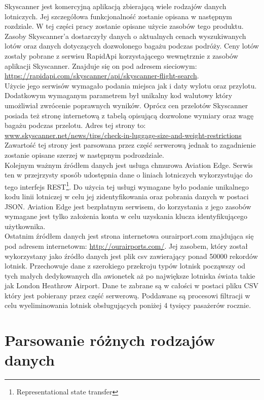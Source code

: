 \documentclass[12pt, twoside]{report}
\begin{document}
Skyscanner jest komercyjną aplikacją zbierającą wiele rodzajów danych lotniczych. Jej szczegółowa funkcjonalność zostanie opisana w następnym rozdziale. W tej części pracy zostanie opisane użycie zasobów tego produktu. Zasoby Skyscanner'a dostarczyły danych o aktualnych cenach wyszukiwanych lotów oraz danych dotyczących dozwolonego bagażu podczas podróży. Ceny lotów zostały pobrane z serwisu RapidApi korzystającego wewnętrznie z zasobów aplikacji Skyscanner. Znajduje się on pod adresem sieciowym: \url{https://rapidapi.com/skyscanner/api/skyscanner-flight-search}.\\
Użycie jego serwisów wymagało podania miejsca jak i daty wylotu oraz przylotu. Dodatkowym wymaganym parametrem był unikalny kod walutowy który umożliwiał zwrócenie poprawnych wyników. Oprócz cen przelotów Skyscanner posiada też stronę internetową z tabelą opisującą dozwolone wymiary oraz wagę bagażu podczas przelotu. Adres tej strony to: \url{www.skyscanner.net/news/tips/check-in-luggage-size-and-weight-restrictions}\\
Zawartość tej strony jest parsowana przez część serwerową jednak to zagadnienie zostanie opisane szerzej w następnym podrozdziale.\\ \indent
Kolejnym ważnym źródłem danych jest usługa chmurowa Aviation Edge. Serwis ten w przejrzysty sposób udostępnia dane o liniach lotniczych wykorzystując do tego interfejs REST\footnote{Representational state transfer}. Do użycia tej usługi wymagane było podanie unikalnego kodu linii lotniczej w celu jej zidentyfikowania oraz pobrania danych w postaci JSON. Aviation Edge jest bezpłatnym serwisem, do korzystania z jego zasobów wymagane jest tylko założenia konta w celu uzyskania klucza identyfikującego użytkownika. \\ \indent
Ostatnim źródłem danych jest strona internetowa ourairport.com znajdująca się pod adresem internetowm: \url{http://ourairports.com/}. Jej zasobem, który został wykorzystany jako źródło danych jest plik csv zawierający ponad 50000 rekordów lotnisk. Przechowuje dane z szerokiego przekroju typów lotnisk począwszy od tych małych dedykowanych dla awionetek aż po największe lotniska świata takie jak London Heathrow Airport. Dane te zabrane są w całości w postaci pliku CSV który jest pobierany przez część serwerową. Poddawane są procesowi filtracji w celu wyeliminowania lotnisk obsługujących poniżej 4 tysięcy pasażerów rocznie.
\newpage
\section{Parsowanie różnych rodzajów danych}
\end{document}

